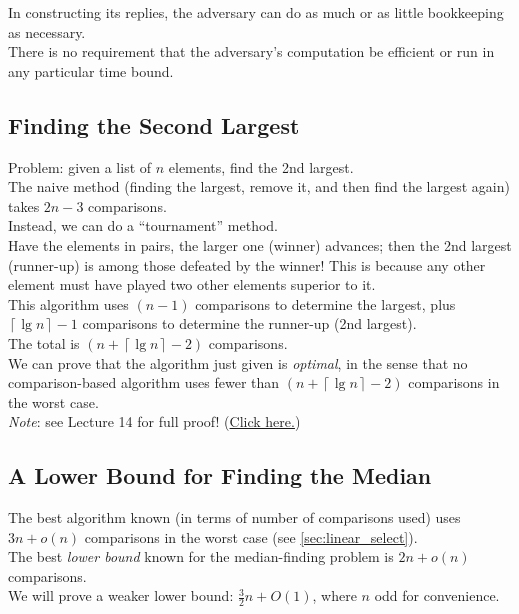 \documentclass[12pt]{article}
\theoremstyle{plain}
\theoremstyle{definition}
\newcommand{\ceil}[1]{\ensuremath{\left\lceil #1 \right\rceil}}
\begin{document}
In constructing its replies, the adversary can do as much or as little bookkeeping as necessary. \\
There is no requirement that the adversary's computation be efficient or run in any particular time bound.

\subsection{Finding the Second Largest}
Problem: given a list of $n$ elements, find the 2nd largest. \\

The naive method (finding the largest, remove it, and then find the largest again) takes $2n - 3$ comparisons. \\
Instead, we can do a ``tournament'' method. \\
Have the elements in pairs, the larger one (winner) advances;
then the 2nd largest (runner-up) is among those defeated by the winner!
This is because any other element must have played two other elements superior to it. \\

This algorithm uses $(n - 1)$ comparisons to determine the largest, plus $\ceil{\lg n} - 1$ comparisons to determine the runner-up (2nd largest). \\
The total is $(n + \ceil{\lg n} - 2)$ comparisons. \\

We can prove that the algorithm just given is \emph{optimal}, in the sense that no comparison-based algorithm uses fewer than $(n + \ceil{\lg n} - 2)$ comparisons in the worst case. \\

\emph{Note}: see Lecture 14 for full proof! (\href{https://www.student.cs.uwaterloo.ca/~cs341/lecture14.html}{Click here.})

\subsection{A Lower Bound for Finding the Median}
The best algorithm known (in terms of number of comparisons used) uses $3n + o(n)$ comparisons in the worst case (see \ref{sec:linear_select}). \\
The best \emph{lower bound} known for the median-finding problem is $2n + o(n)$ comparisons. \\

We will prove a weaker lower bound: $\frac{3}{2}n + O(1)$, where $n$ odd for convenience. \\
\end{document}
